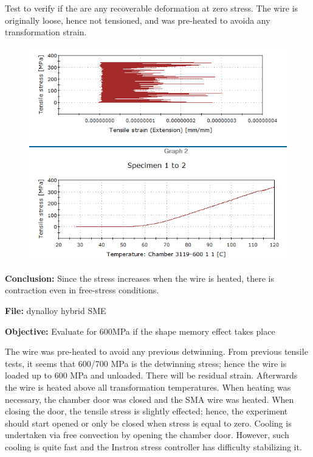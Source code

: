 \documentclass[idxtotoc,hyperref,openany]{labbook} %
\begin{document}
Test to verify if the are any recoverable deformation at zero stress. The wire is originally loose, hence not tensioned, and was pre-heated to avoida any transformation strain.  
\begin{figure}[ht]
\centering
\includegraphics[width=\linewidth]{DYN1_single_temperature_0p.png}
\end{figure}

\textbf{Conclusion:} Since the stress increases when the wire is heated, there is contraction even in free-stress conditions.


\textbf{File:} dynalloy hybrid SME

\textbf{Objective:} Evaluate for 600MPa if the shape memory effect takes place

The wire was pre-heated to avoid any previous detwinning. From previous tensile tests, it seems that 600/700 MPa is the detwinning stress; hence the wire is loaded up to 600 MPa and unloaded. There will be residual strain. Afterwards the wire is heated above all transformation temperatures. When heating was necessary, the chamber door was closed and the SMA wire was heated. When closing the door, the tensile stress is slightly effected; hence, the experiment should start opened or only be closed when stress is equal to zero. Cooling is undertaken via free convection by opening the chamber door. However, such cooling is quite fast and the Instron stress controller has difficulty stabilizing it.
\end{document}
